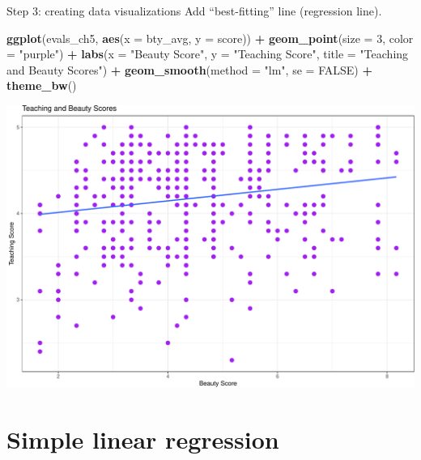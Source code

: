 \documentclass[
  ignorenonframetext,
]{beamer}
\newenvironment{Shaded}{\begin{snugshade}}{\end{snugshade}}
\newcommand{\AttributeTok}[1]{\textcolor[rgb]{0.13,0.29,0.53}{#1}}
\newcommand{\ConstantTok}[1]{\textcolor[rgb]{0.56,0.35,0.01}{#1}}
\newcommand{\DecValTok}[1]{\textcolor[rgb]{0.00,0.00,0.81}{#1}}
\newcommand{\FunctionTok}[1]{\textcolor[rgb]{0.13,0.29,0.53}{\textbf{#1}}}
\newcommand{\NormalTok}[1]{#1}
\newcommand{\SpecialCharTok}[1]{\textcolor[rgb]{0.81,0.36,0.00}{\textbf{#1}}}
\newcommand{\StringTok}[1]{\textcolor[rgb]{0.31,0.60,0.02}{#1}}
\begin{document}
\begin{frame}[fragile]{Step 3: creating data visualizations}
\protect\hypertarget{step-3-creating-data-visualizations}{}
Add ``best-fitting'' line (regression line).

\tiny

\begin{Shaded}
\begin{Highlighting}[]
\FunctionTok{ggplot}\NormalTok{(evals\_ch5, }\FunctionTok{aes}\NormalTok{(}\AttributeTok{x =}\NormalTok{ bty\_avg, }\AttributeTok{y =}\NormalTok{ score)) }\SpecialCharTok{+}
  \FunctionTok{geom\_point}\NormalTok{(}\AttributeTok{size =} \DecValTok{3}\NormalTok{, }\AttributeTok{color =} \StringTok{"purple"}\NormalTok{) }\SpecialCharTok{+}
  \FunctionTok{labs}\NormalTok{(}\AttributeTok{x =} \StringTok{"Beauty Score"}\NormalTok{, }\AttributeTok{y =} \StringTok{"Teaching Score"}\NormalTok{,}
       \AttributeTok{title =} \StringTok{"Teaching and Beauty Scores"}\NormalTok{) }\SpecialCharTok{+}  
  \FunctionTok{geom\_smooth}\NormalTok{(}\AttributeTok{method =} \StringTok{"lm"}\NormalTok{, }\AttributeTok{se =} \ConstantTok{FALSE}\NormalTok{) }\SpecialCharTok{+} 
  \FunctionTok{theme\_bw}\NormalTok{()}
\end{Highlighting}
\end{Shaded}

\begin{center}\includegraphics[width=0.6\linewidth,height=0.45\textheight]{Week4_Lect_files/figure-beamer/unnamed-chunk-17-1} \end{center}
\normalsize
\end{frame}

\hypertarget{simple-linear-regression}{%
\section{Simple linear regression}\label{simple-linear-regression}}
\end{document}
